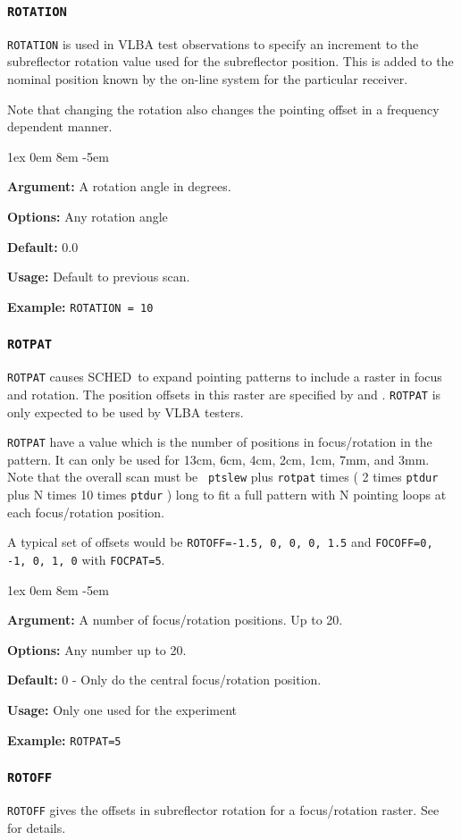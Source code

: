\documentclass{report}
\newcommand{\schedb}{{\sc SCHED~}}
\newcommand{\rcwbox}[5]{
  \begin{list}{}{\parsep 1ex  \itemsep 0em
                 \leftmargin 8em  \itemindent -5em }
    \item {\bf Argument:} #1
    \item {\bf Options:}  #2
    \item {\bf Default:}  #3
    \item {\bf Usage:}    #4
    \item {\bf Example:}  #5
  \end{list}
}
\begin{document}
\subsubsection{\label{MP:ROTATION}\tt ROTATION}

{\tt ROTATION} is used in VLBA test observations to specify an
increment to the subreflector rotation value used for the subreflector
position.  This is added to the nominal position known by the on-line
system for the particular receiver.

Note that changing the rotation also changes the pointing offset
in a frequency dependent manner.

\rcwbox
{A rotation angle in degrees.}
{Any rotation angle}
{0.0}
{Default to previous scan.}
{{\tt ROTATION = 10 }}

\subsubsection{\label{MP:ROTPAT}\tt ROTPAT}

{\tt ROTPAT} causes \schedb to expand pointing patterns to include
a raster in focus and rotation.  The position offsets in this
raster are specified by  and
.  {\tt ROTPAT} is only expected
to be used by VLBA testers.

{\tt ROTPAT} have a value which is the number of positions in
focus/rotation in the pattern.  It can only be used for 13cm, 6cm,
4cm, 2cm, 1cm, 7mm, and 3mm.  Note that the overall scan must be {\tt
ptslew} plus {\tt rotpat} times ( 2 times {\tt ptdur} plus N times 10
times {\tt ptdur} ) long to fit a full pattern with N pointing loops
at each focus/rotation position.

A typical set of offsets would be {\tt ROTOFF=-1.5, 0, 0, 0, 1.5}
and {\tt FOCOFF=0, -1, 0, 1, 0} with {\tt FOCPAT=5}.

\rcwbox
{A number of focus/rotation positions.  Up to 20.}
{Any number up to 20.}
{0 - Only do the central focus/rotation position.}
{Only one used for the experiment}
{{\tt ROTPAT=5}}

\subsubsection{\label{MP:ROTOFF}\tt ROTOFF}

{\tt ROTOFF} gives the offsets in subreflector rotation for a
focus/rotation raster.  See  for
details.
\end{document}
